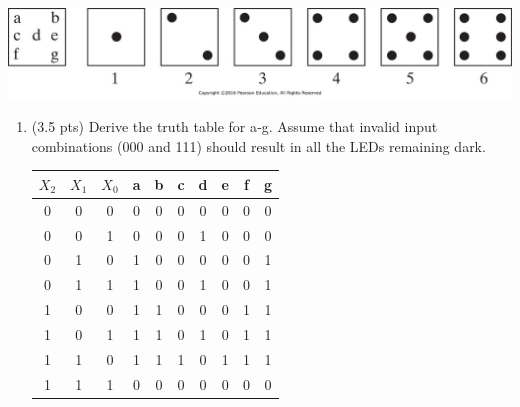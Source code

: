 \documentclass[12pt,letterpaper,titlepage]{report}
\begin{document}
\begin{raggedright}
\includegraphics[width=\columnwidth]{hw5p3}

\begin{enumerate} [label=\alph*)]
\item (3.5 pts) Derive the truth table for a‐g. Assume that invalid input combinations (000 and 111) should result in all the LEDs remaining dark.

\begin{center}
\begin{tabular}{|c c c| c c c c c c c |}\hline
$X_2$ & $X_1$ & $X_0$ & a & b & c & d & e & f & g \\\hline
            0 & 0 & 0 & 0 & 0 & 0 & 0 & 0 & 0 & 0 \\\hline
            0 & 0 & 1 & 0 & 0 & 0 & 1 & 0 & 0 & 0 \\\hline
            0 & 1 & 0 & 1 & 0 & 0 & 0 & 0 & 0 & 1 \\\hline
            0 & 1 & 1 & 1 & 0 & 0 & 1 & 0 & 0 & 1 \\\hline
            1 & 0 & 0 & 1 & 1 & 0 & 0 & 0 & 1 & 1 \\\hline
            1 & 0 & 1 & 1 & 1 & 0 & 1 & 0 & 1 & 1 \\\hline
            1 & 1 & 0 & 1 & 1 & 1 & 0 & 1 & 1 & 1 \\\hline
            1 & 1 & 1 & 0 & 0 & 0 & 0 & 0 & 0 & 0 \\\hline
\end{tabular}
\end{center}


\end{enumerate}
\end{raggedright}
\end{document}
